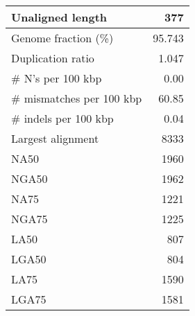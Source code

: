 \documentclass[12pt,a4paper]{article}
\begin{document}
\begin{table}[ht]
\begin{center}
\begin{tabular}{|l*{1}{|r}|}
Unaligned length & 377 \\ \hline
Genome fraction (\%) & 95.743 \\ \hline
Duplication ratio & 1.047 \\ \hline
\# N's per 100 kbp & 0.00 \\ \hline
\# mismatches per 100 kbp & 60.85 \\ \hline
\# indels per 100 kbp & 0.04 \\ \hline
Largest alignment & 8333 \\ \hline
NA50 & 1960 \\ \hline
NGA50 & 1962 \\ \hline
NA75 & 1221 \\ \hline
NGA75 & 1225 \\ \hline
LA50 & 807 \\ \hline
LGA50 & 804 \\ \hline
LA75 & 1590 \\ \hline
LGA75 & 1581 \\ \hline
\end{tabular}
\end{center}
\end{table}
\end{document}
